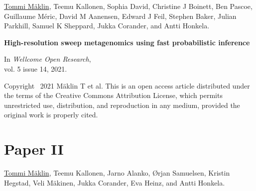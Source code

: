 \vspace{80pt}
\underline{Tommi Mäklin}, Teemu Kallonen, Sophia David, Christine J
Boinett, Ben Pascoe, Guillaume Méric, David M Aanensen, Edward J Feil,
Stephen Baker, Julian Parkhill, Samuel K Sheppard, Jukka Corander, and
Antti Honkela.

\vspace{10pt}
\noindent\textbf{High-resolution sweep metagenomics using fast probabilistic inference}

\vspace{10pt}
\noindent In
\emph{Wellcome Open Research},
\\vol. 5 issue 14, 2021.

\vspace{60pt}
\noindent Copyright \textcopyright\ 2021 Mäklin T et al. This is an
open access article distributed under the terms of the Creative
Commons Attribution License, which permits unrestricted use,
distribution, and reproduction in any medium, provided the original
work is properly cited.

\cleardoublepage





\chapter*{Paper II}\thispagestyle{plain}







\vspace{80pt}

\underline{Tommi Mäklin}, Teemu Kallonen, Jarno Alanko, Ørjan
Samuelsen, Kristin Hegstad, Veli Mäkinen, Jukka Corander, Eva Heinz,
and Antti Honkela.


